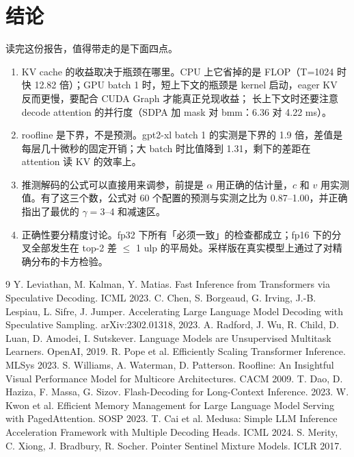 \documentclass[11pt,a4paper]{ctexart}
\begin{document}
\section{结论}

读完这份报告，值得带走的是下面四点。
\begin{enumerate}
  \item KV cache 的收益取决于瓶颈在哪里。CPU 上它省掉的是 FLOP（T=1024 时快 12.82 倍）；GPU batch 1 时，短上下文的瓶颈是 kernel 启动，eager KV 反而更慢，要配合 CUDA Graph 才能真正兑现收益；
        长上下文时还要注意 decode attention 的并行度（SDPA 加 mask 对 bmm：6.36 对 4.22 ms）。
  \item roofline 是下界，不是预测。gpt2-xl batch 1 的实测是下界的 1.9 倍，差值是每层几十微秒的固定开销；大 batch 时比值降到 1.31，剩下的差距在 attention 读 KV 的效率上。
  \item 推测解码的公式可以直接用来调参，前提是 $\alpha$ 用正确的估计量，$c$ 和 $v$ 用实测值。有了这三个数，公式对 60 个配置的预测与实测之比为 0.87--1.00，并正确指出了最优的 $\gamma{=}3$--4 和减速区。
  \item 正确性要分精度讨论。fp32 下所有「必须一致」的检查都成立；fp16 下的分叉全部发生在 top-2 差 $\le$ 1 ulp 的平局处。采样版在真实模型上通过了对精确分布的卡方检验。
\end{enumerate}

\begin{thebibliography}{9}
 Y. Leviathan, M. Kalman, Y. Matias. Fast Inference from Transformers via Speculative Decoding. ICML 2023.
 C. Chen, S. Borgeaud, G. Irving, J.-B. Lespiau, L. Sifre, J. Jumper. Accelerating Large Language Model Decoding with Speculative Sampling. arXiv:2302.01318, 2023.
 A. Radford, J. Wu, R. Child, D. Luan, D. Amodei, I. Sutskever. Language Models are Unsupervised Multitask Learners. OpenAI, 2019.
 R. Pope et al. Efficiently Scaling Transformer Inference. MLSys 2023.
 S. Williams, A. Waterman, D. Patterson. Roofline: An Insightful Visual Performance Model for Multicore Architectures. CACM 2009.
 T. Dao, D. Haziza, F. Massa, G. Sizov. Flash-Decoding for Long-Context Inference. 2023.
 W. Kwon et al. Efficient Memory Management for Large Language Model Serving with PagedAttention. SOSP 2023.
 T. Cai et al. Medusa: Simple LLM Inference Acceleration Framework with Multiple Decoding Heads. ICML 2024.
 S. Merity, C. Xiong, J. Bradbury, R. Socher. Pointer Sentinel Mixture Models. ICLR 2017.
\end{thebibliography}
\end{document}
